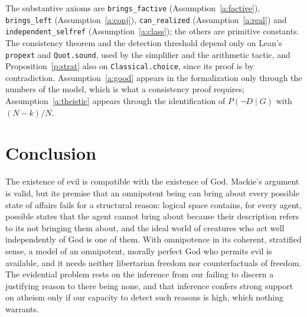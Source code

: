 \documentclass{situationist-preprint}
\begin{document}
The substantive axioms are \texttt{brings\_factive} (Assumption~\ref{a:factive}), \texttt{brings\_left} (Assumption~\ref{a:conj}), \texttt{can\_realized} (Assumption~\ref{a:real}) and \texttt{independent\_selfref} (Assumption~\ref{a:class}); the others are primitive constants. The consistency theorem and the detection threshold depend only on Lean's \texttt{propext} and \texttt{Quot.sound}, used by the simplifier and the arithmetic tactic, and Proposition~\ref{p:strat} also on \texttt{Classical.choice}, since its proof is by contradiction. Assumption~\ref{a:good} appears in the formalization only through the numbers of the model, which is what a consistency proof requires; Assumption~\ref{a:theistic} appears through the identification of $P(\neg D \mid G)$ with $(N-k)/N$.

\section{Conclusion}\label{s:conclusion}

The existence of evil is compatible with the existence of God. Mackie's argument is valid, but its premise that an omnipotent being can bring about every possible state of affairs fails for a structural reason: logical space contains, for every agent, possible states that the agent cannot bring about because their description refers to its not bringing them about, and the ideal world of creatures who act well independently of God is one of them. With omnipotence in its coherent, stratified sense, a model of an omnipotent, morally perfect God who permits evil is available, and it needs neither libertarian freedom nor counterfactuals of freedom. The evidential problem rests on the inference from our failing to discern a justifying reason to there being none, and that inference confers strong support on atheism only if our capacity to detect such reasons is high, which nothing warrants.
\end{document}
